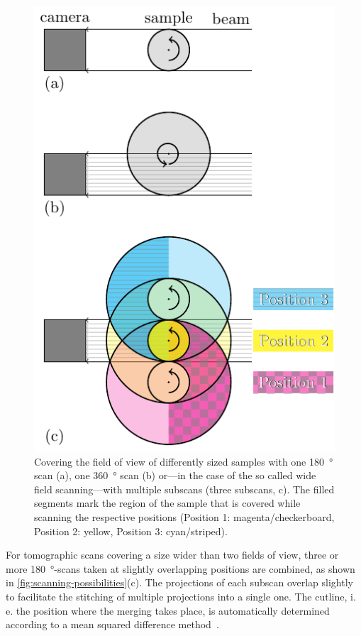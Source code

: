 \renewcommand{\imsize}{\linewidth}
\begin{figure}
	\centering
	\includegraphics{img/Haberthuer2010/Fig01-FOV}
	\caption[Covering the field of view of differently sized samples]{Covering the field of view of differently sized samples with one \SI{180}{\degree} scan (a), one \SI{360}{\degree} scan (b) or---in the case of the so called wide field scanning---with multiple subscans (three subscans, c). The filled segments mark the region of the sample that is covered while scanning the respective positions (Position 1: magenta/checkerboard, Position 2: yellow, Position 3: cyan/striped).}
	\label{fig:scanning-possibilities}
\end{figure}

For tomographic scans covering a size wider than two fields of view, three or more \SI{180}{\degree}-scans taken at slightly overlapping positions are combined, as shown in \autoref{fig:scanning-possibilities}(c). The projections of each subscan overlap slightly to facilitate the stitching of multiple projections into a single one. The cutline, i.\,e. the position where the merging takes place, is automatically determined according to a mean squared difference method~\cite{Hintermueller2010}.

